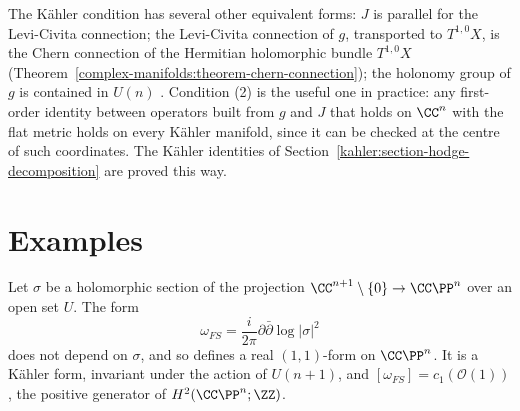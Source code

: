 \begin{remark}\label{kahler:remark-levi-civita}
The K\"ahler condition has several other equivalent forms: $J$ is parallel for the Levi-Civita connection; the Levi-Civita connection of $g$,
transported to $T^{1,0}X$, is the Chern connection of the Hermitian holomorphic bundle $T^{1,0}X$
(Theorem~\ref{complex-manifolds:theorem-chern-connection}); the holonomy group of $g$ is contained in $U(n)$ \cite[Chapter 4]{huybrechts-complex}.
Condition (2) is the useful one in practice: any first-order identity between operators built from $g$ and $J$ that holds on $\CC^n$ with
the flat metric holds on every K\"ahler manifold, since it can be checked at the centre of such coordinates. The K\"ahler identities of
Section~\ref{kahler:section-hodge-decomposition} are proved this way.
\end{remark}

\section{Examples}\label{kahler:section-examples}

\begin{proposition}\label{kahler:proposition-fubini-study}
Let $\sigma$ be a holomorphic section of the projection $\CC^{n+1} \setminus \{0\} \to \CC\PP^n$ over an open set $U$. The form
\[
\omega_{FS} = \frac{i}{2\pi}\partial\bar\partial\log|\sigma|^2
\]
does not depend on $\sigma$, and so defines a real $(1,1)$-form on $\CC\PP^n$. It is a K\"ahler form, invariant under the action of
$U(n+1)$, and $[\omega_{FS}] = c_1(\mathcal{O}(1))$, the positive generator of $H^2(\CC\PP^n; \ZZ)$.
\end{proposition}

